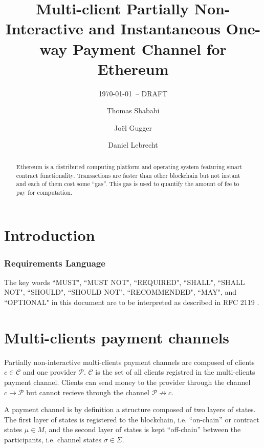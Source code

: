 \documentclass{llncs}
\begin{document}
\title{Multi-client Partially Non-Interactive and Instantaneous One-way Payment Channel for Ethereum}
\author{Thomas Shababi \and Jo\"el Gugger \and Daniel Lebrecht}

\subtitle{{\normalsize\today{\small\ -- DRAFT}}}

\maketitle

\begin{abstract} Ethereum is a distributed computing platform and operating system featuring smart contract functionality. Transactions are faster than other blockchain but not instant and each of them cost some ``gas''. This gas is used to quantify the amount of fee to pay for computation. 
\end{abstract}

\section{Introduction} 

\subsubsection{Requirements Language}
The key words ``MUST", ``MUST NOT", ``REQUIRED", ``SHALL", ``SHALL NOT",
``SHOULD", ``SHOULD NOT", ``RECOMMENDED", ``MAY", and ``OPTIONAL" in this
document are to be interpreted as described in RFC 2119 \cite{Bradner1997}.

\section{Multi-clients payment channels} Partially non-interactive multi-clients payment channels are composed of clients $c \in \mathcal{C}$ and one provider $\mathcal{P}$. $\mathcal{C}$ is the set of all clients registred in the multi-clients payment channel. Clients can send money to the provider through the channel $c \rightarrow \mathcal{P}$ but cannot recieve through the channel $\mathcal{P} \not\rightarrow c$.

A payment channel is by definition a structure composed of two layers of states. The first layer of states is registered to the blockchain, i.e. ``on-chain'' or contract states $\mu \in M$, and the second layer of states is kept ``off-chain'' between the participants, i.e. channel states $\sigma \in \Sigma$.
\end{document}
